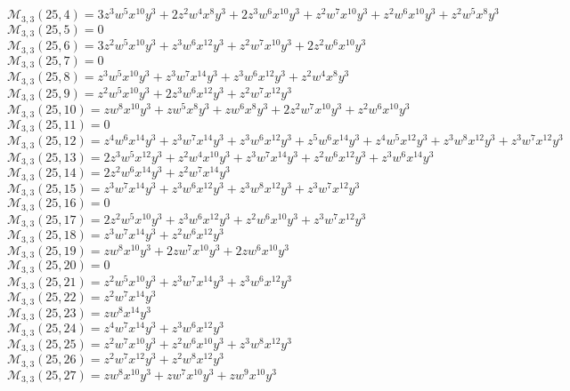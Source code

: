 $\mathcal{M}_{3,3}(25,4)=3z^3w^5x^{10}y^3+2z^2w^4x^8y^3+2z^3w^6x^{10}y^3+z^2w^7x^{10}y^3+z^2w^6x^{10}y^3+z^2w^5x^8y^3$\\
$\mathcal{M}_{3,3}(25,5)=0$\\
$\mathcal{M}_{3,3}(25,6)=3z^2w^5x^{10}y^3+z^3w^6x^{12}y^3+z^2w^7x^{10}y^3+2z^2w^6x^{10}y^3$\\
$\mathcal{M}_{3,3}(25,7)=0$\\
$\mathcal{M}_{3,3}(25,8)=z^3w^5x^{10}y^3+z^3w^7x^{14}y^3+z^3w^6x^{12}y^3+z^2w^4x^8y^3$\\
$\mathcal{M}_{3,3}(25,9)=z^2w^5x^{10}y^3+2z^3w^6x^{12}y^3+z^2w^7x^{12}y^3$\\
$\mathcal{M}_{3,3}(25,10)=zw^8x^{10}y^3+zw^5x^8y^3+zw^6x^8y^3+2z^2w^7x^{10}y^3+z^2w^6x^{10}y^3$\\
$\mathcal{M}_{3,3}(25,11)=0$\\
$\mathcal{M}_{3,3}(25,12)=z^4w^6x^{14}y^3+z^3w^7x^{14}y^3+z^3w^6x^{12}y^3+z^5w^6x^{14}y^3+z^4w^5x^{12}y^3+z^3w^8x^{12}y^3+z^3w^7x^{12}y^3$\\
$\mathcal{M}_{3,3}(25,13)=2z^3w^5x^{12}y^3+z^2w^4x^{10}y^3+z^3w^7x^{14}y^3+z^2w^6x^{12}y^3+z^3w^6x^{14}y^3$\\
$\mathcal{M}_{3,3}(25,14)=2z^2w^6x^{14}y^3+z^2w^7x^{14}y^3$\\
$\mathcal{M}_{3,3}(25,15)=z^3w^7x^{14}y^3+z^3w^6x^{12}y^3+z^3w^8x^{12}y^3+z^3w^7x^{12}y^3$\\
$\mathcal{M}_{3,3}(25,16)=0$\\
$\mathcal{M}_{3,3}(25,17)=2z^2w^5x^{10}y^3+z^3w^6x^{12}y^3+z^2w^6x^{10}y^3+z^3w^7x^{12}y^3$\\
$\mathcal{M}_{3,3}(25,18)=z^3w^7x^{14}y^3+z^2w^6x^{12}y^3$\\
$\mathcal{M}_{3,3}(25,19)=zw^8x^{10}y^3+2zw^7x^{10}y^3+2zw^6x^{10}y^3$\\
$\mathcal{M}_{3,3}(25,20)=0$\\
$\mathcal{M}_{3,3}(25,21)=z^2w^5x^{10}y^3+z^3w^7x^{14}y^3+z^3w^6x^{12}y^3$\\
$\mathcal{M}_{3,3}(25,22)=z^2w^7x^{14}y^3$\\
$\mathcal{M}_{3,3}(25,23)=zw^8x^{14}y^3$\\
$\mathcal{M}_{3,3}(25,24)=z^4w^7x^{14}y^3+z^3w^6x^{12}y^3$\\
$\mathcal{M}_{3,3}(25,25)=z^2w^7x^{10}y^3+z^2w^6x^{10}y^3+z^3w^8x^{12}y^3$\\
$\mathcal{M}_{3,3}(25,26)=z^2w^7x^{12}y^3+z^2w^8x^{12}y^3$\\
$\mathcal{M}_{3,3}(25,27)=zw^8x^{10}y^3+zw^7x^{10}y^3+zw^9x^{10}y^3$\\
